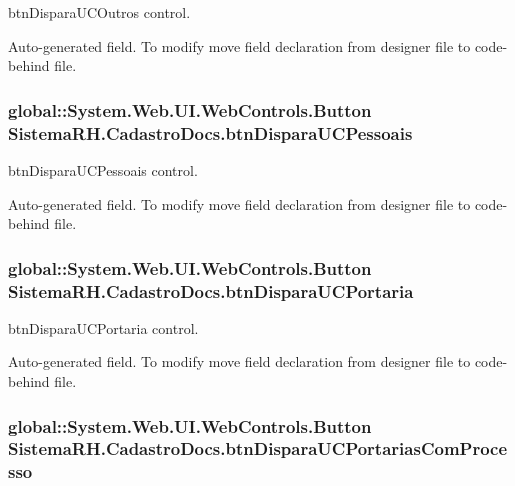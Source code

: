 btnDisparaUCOutros control. 

Auto-\/generated field. To modify move field declaration from designer file to code-\/behind file. \hypertarget{class_sistema_r_h_1_1_cadastro_docs_aa5743f25e56e06c7f634e9a018c9c353}{
\subsubsection[{btnDisparaUCPessoais}]{\setlength{\rightskip}{0pt plus 5cm}global::System.Web.UI.WebControls.Button {\bf SistemaRH.CadastroDocs.btnDisparaUCPessoais}}}
\label{class_sistema_r_h_1_1_cadastro_docs_aa5743f25e56e06c7f634e9a018c9c353}


btnDisparaUCPessoais control. 

Auto-\/generated field. To modify move field declaration from designer file to code-\/behind file. \hypertarget{class_sistema_r_h_1_1_cadastro_docs_ad0ac6383b315acbfc97bb88293db52f8}{
\subsubsection[{btnDisparaUCPortaria}]{\setlength{\rightskip}{0pt plus 5cm}global::System.Web.UI.WebControls.Button {\bf SistemaRH.CadastroDocs.btnDisparaUCPortaria}}}
\label{class_sistema_r_h_1_1_cadastro_docs_ad0ac6383b315acbfc97bb88293db52f8}


btnDisparaUCPortaria control. 

Auto-\/generated field. To modify move field declaration from designer file to code-\/behind file. \hypertarget{class_sistema_r_h_1_1_cadastro_docs_a02b00ab22821e0f99d60c628b6d12d7e}{
\subsubsection[{btnDisparaUCPortariasComProcesso}]{\setlength{\rightskip}{0pt plus 5cm}global::System.Web.UI.WebControls.Button {\bf SistemaRH.CadastroDocs.btnDisparaUCPortariasComProcesso}}}
\label{class_sistema_r_h_1_1_cadastro_docs_a02b00ab22821e0f99d60c628b6d12d7e}


